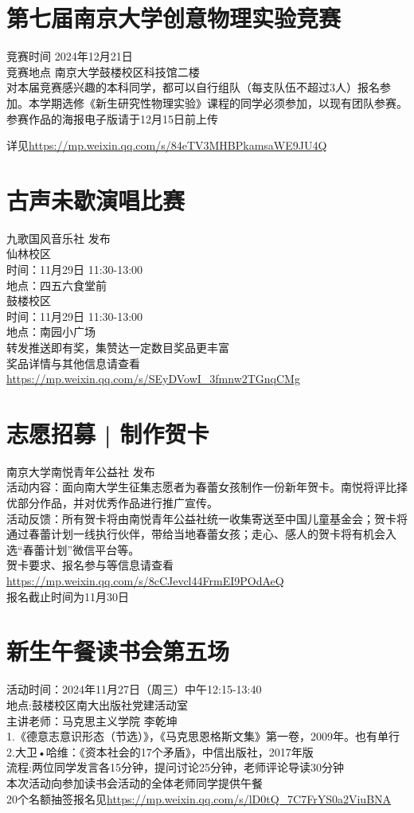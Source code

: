\documentclass[letterpaper, 12pt]{article}
\begin{document}
\begin{multicols}{2}
\section{第七届南京大学创意物理实验竞赛}
竞赛时间 2024年12月21日\\
竞赛地点 南京大学鼓楼校区科技馆二楼\\
对本届竞赛感兴趣的本科同学，都可以自行组队（每支队伍不超过3人）报名参加。本学期选修《新生研究性物理实验》课程的同学必须参加，以现有团队参赛。\\
参赛作品的海报电子版请于12月15日前上传

详见\url{https://mp.weixin.qq.com/s/84eTV3MHBPkamsaWE9JU4Q}

\section{古声未歇演唱比赛}
九歌国风音乐社 发布\\
仙林校区\\
时间：11月29日 11:30-13:00\\
地点：四五六食堂前\\
鼓楼校区\\
时间：11月29日 11:30-13:00\\
地点：南园小广场\\
转发推送即有奖，集赞达一定数目奖品更丰富\\
奖品详情与其他信息请查看\url{https://mp.weixin.qq.com/s/SEyDVowI_3fmnw2TGnqCMg}\\

\section{志愿招募 | 制作贺卡}
南京大学南悦青年公益社 发布\\
活动内容：面向南大学生征集志愿者为春蕾女孩制作一份新年贺卡。南悦将评比择优部分作品，并对优秀作品进行推广宣传。\\
活动反馈：所有贺卡将由南悦青年公益社统一收集寄送至中国儿童基金会；贺卡将通过春蕾计划一线执行伙伴，带给当地春蕾女孩；走心、感人的贺卡将有机会入选“春蕾计划”微信平台等。\\
贺卡要求、报名参与等信息请查看\url{https://mp.weixin.qq.com/s/8cCJevcl44FrmEI9POdAeQ}\\报名截止时间为11月30日

\section{新生午餐读书会第五场}
活动时间：2024年11月27日（周三）中午12:15-13:40\\
地点:鼓楼校区南大出版社党建活动室\\
主讲老师：马克思主义学院 李乾坤\\
1.《德意志意识形态（节选）》，《马克思恩格斯文集》第一卷，2009年。也有单行\\
2.大卫•哈维：《资本社会的17个矛盾》，中信出版社，2017年版\\
流程:两位同学发言各15分钟，提问讨论25分钟，老师评论导读30分钟\\
本次活动向参加读书会活动的全体老师同学提供午餐\\
20个名额抽签报名见\url{https://mp.weixin.qq.com/s/lD0tQ_7C7FrYS0a2ViuBNA}


\end{multicols}
\end{document}
